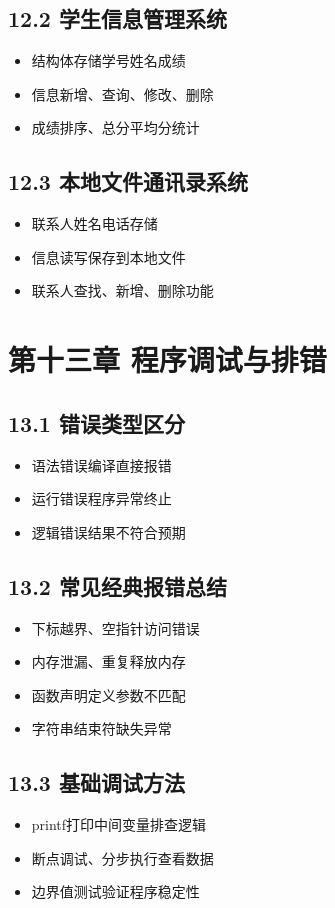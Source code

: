 \subsection*{12.2 学生信息管理系统}
\begin{itemize}
\item 结构体存储学号姓名成绩
\item 信息新增、查询、修改、删除
\item 成绩排序、总分平均分统计
\end{itemize}

\subsection*{12.3 本地文件通讯录系统}
\begin{itemize}
\item 联系人姓名电话存储
\item 信息读写保存到本地文件
\item 联系人查找、新增、删除功能
\end{itemize}

\section*{第十三章 程序调试与排错}
\subsection*{13.1 错误类型区分}
\begin{itemize}
\item 语法错误编译直接报错
\item 运行错误程序异常终止
\item 逻辑错误结果不符合预期
\end{itemize}

\subsection*{13.2 常见经典报错总结}
\begin{itemize}
\item 下标越界、空指针访问错误
\item 内存泄漏、重复释放内存
\item 函数声明定义参数不匹配
\item 字符串结束符缺失异常
\end{itemize}

\subsection*{13.3 基础调试方法}
\begin{itemize}
\item printf打印中间变量排查逻辑
\item 断点调试、分步执行查看数据
\item 边界值测试验证程序稳定性
\end{itemize}
